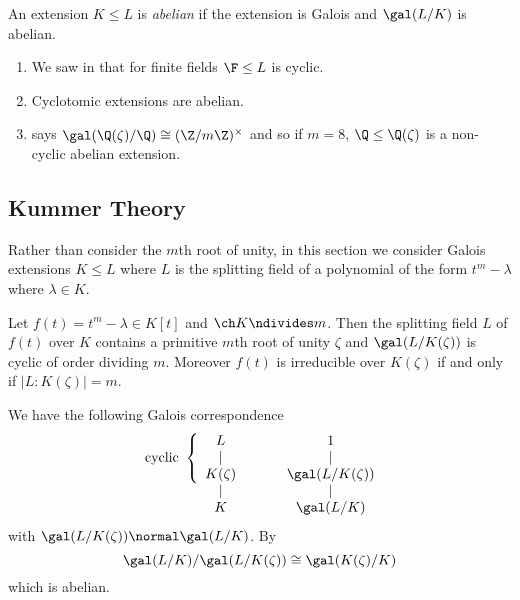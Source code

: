 \documentclass[a4paper]{article}
\begin{document}
\begin{definition}
  An extension \(K \leq L\) is \emph{abelian} if the extension is Galois and \(\gal(L/K)\) is abelian.
\end{definition}

\begin{eg}\leavevmode
  \begin{enumerate}
  \item We saw in  that for finite fields \(\F \leq L\) is cyclic.
  \item Cyclotomic extensions are abelian.
  \item {} says \(\gal(\Q(\zeta)/\Q) \cong  (\Z/m\Z)^\times\) and so if \(m = 8\), \(\Q \leq \Q(\zeta)\) is a non-cyclic abelian extension.
  \end{enumerate}
\end{eg}

\subsection{Kummer Theory}

Rather than consider the \(m\)th root of unity, in this section we consider Galois extensions \(K \leq L\) where \(L\) is the splitting field of a polynomial of the form \(t^m - \lambda\) where \(\lambda \in K\).

\begin{theorem}
  \label{thm:splitting field of tm - lambda}
  Let \(f(t) = t^m - \lambda \in K[t]\) and \(\ch K \ndivides m\). Then the splitting field \(L\) of \(f(t)\) over \(K\) contains a primitive \(m\)th root of unity \(\zeta\) and \(\gal(L/K(\zeta))\) is cyclic of order dividing \(m\). Moreover \(f(t)\) is irreducible over \(K(\zeta)\) if and only if \(|L:K(\zeta)| = m\).
\end{theorem}

\begin{remark}
  We have the following Galois correspondence
  \[
    \begin{array}[h]{c}
      \text{cyclic }\left\{
      \begin{array}[h]{c}
        L \\
        | \\
        K(\zeta)
      \end{array}
      \right. \\
      \hspace{37pt} | \\
      \hspace{37pt} K
    \end{array}
  \qquad
    \begin{array}[h]{c}
      1 \\
      | \\
      \gal(L/K(\zeta)) \\
      | \\
      \gal(L/K)
    \end{array}
  \]
  with \(\gal(L/K(\zeta)) \normal \gal(L/K)\). By 
  \[
    \gal(L/K)/\gal(L/K(\zeta)) \cong \gal(K(\zeta)/K)
  \]
  which is abelian.
\end{remark}
\end{document}
